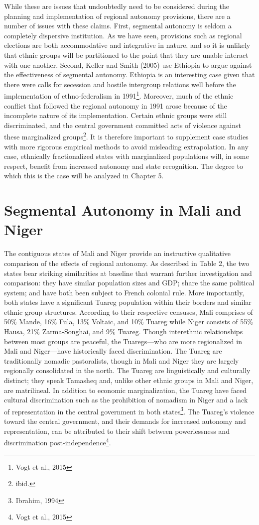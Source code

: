 \documentclass[12pt]{article}
\begin{document}
While these are issues that undoubtedly need to be considered during the planning and implementation of regional autonomy provisions, there are a number of issues with these claims. First, segmental autonomy is seldom a completely dispersive institution. As we have seen, provisions such as regional elections are both accommodative and integrative in nature, and so it is unlikely that ethnic groups will be partitioned to the point that they are unable interact with one another. Second, Keller and Smith (2005) use Ethiopia to argue against the effectiveness of segmental autonomy. Ethiopia is an interesting case given that there were calls for secession and hostile intergroup relations well before the implementation of ethno-federalism in 1991\footnote{Vogt et al., 2015}. Moreover, much of the ethnic conflict that followed the regional autonomy in 1991 arose because of the incomplete nature of its implementation. Certain ethnic groups were still discriminated, and the central government committed acts of violence against these marginalized groups\footnote{ibid.}. It is therefore important to supplement case studies with more rigorous empirical methods to avoid misleading extrapolation. In any case, ethnically fractionalized states with marginalized populations will, in some respect, benefit from increased autonomy and state recognition. The degree to which this is the case will be analyzed in Chapter 5.

\section{Segmental Autonomy in Mali and Niger}
The contiguous states of Mali and Niger provide an instructive qualitative comparison of the effects of regional autonomy. As described in Table 2, the two states bear striking similarities at baseline that warrant further investigation and comparison: they have similar population sizes and GDP; share the same political system; and have both been subject to French colonial rule. More importantly, both states have a significant Tuareg population within their borders and similar ethnic group structures. According to their respective censuses, Mali comprises of 50\% Mande, 16\% Fula, 13\% Voltaic, and 10\% Tuareg while Niger consists of 55\% Hausa, 21\% Zarma-Songhai, and 9\% Tuareg. Though interethnic relationships between most groups are peaceful, the Tuaregs---who are more regionalized in Mali and Niger---have historically faced discrimination. The Tuareg are traditionally nomadic pastoralists, though in Mali and Niger they are largely regionally consolidated in the north. The Tuareg are linguistically and culturally distinct; they speak Tamasheq and, unlike other ethnic groups in Mali and Niger, are matrilineal. In addition to economic marginalization, the Tuareg have faced cultural discrimination such as the prohibition of nomadism in Niger and a lack of representation in the central government in both states\footnote{Ibrahim, 1994}. The Tuareg's violence toward the central government, and their demands for increased autonomy and representation, can be attributed to their shift between powerlessness and discrimination post-independence\footnote{Vogt et al., 2015}.  
\end{document}
